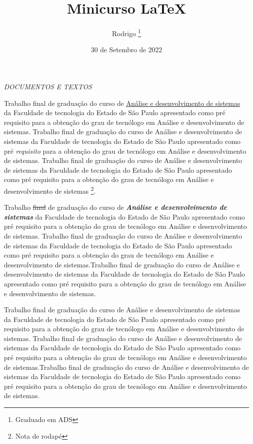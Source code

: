 \documentclass[12pt, a4paper]{article}
\begin{document}
\title{Minicurso LaTeX}
\author{Rodrigo \footnote{Graduado em ADS}}
\date{30 de Setembro de 2022}
\maketitle

\hrulefill

\begin{center}
\Large{\textit{DOCUMENTOS E TEXTOS}}
\end{center}

\hrulefill

\vspace{0.5cm}

Trabalho final de graduação do curso de \underline{Análise e desenvolvimento de sistemas} da Faculdade de tecnologia do Estado de São Paulo apresentado como pré requisito para a obtenção do grau de tecnólogo em Análise e desenvolvimento de sistemas. Trabalho final de graduação do curso de Análise e desenvolvimento de sistemas da Faculdade de tecnologia do Estado de São Paulo apresentado como pré \textit{requisito} para a obtenção do grau de tecnólogo em Análise e desenvolvimento de sistemas. Trabalho final de graduação do curso de Análise e desenvolvimento de sistemas da Faculdade de tecnologia do Estado de São Paulo apresentado como pré requisito para a obtenção do grau de tecnólogo em Análise e desenvolvimento de sistemas \footnote{Nota de rodapé}.

\begin{flushleft}
Trabalho \sout{final} de graduação do curso de \textit{\textbf{Análise e desenvolvimento de sistemas}} da Faculdade de tecnologia do Estado de São Paulo apresentado como pré requisito para a obtenção do grau de tecnólogo em Análise e desenvolvimento de sistemas. Trabalho final de graduação do curso de Análise e desenvolvimento de sistemas da Faculdade de tecnologia do Estado de São Paulo apresentado como pré requisito para a obtenção do grau de tecnólogo em Análise e desenvolvimento de sistemas.Trabalho final de graduação do curso de Análise e desenvolvimento de sistemas da Faculdade de tecnologia do Estado de São Paulo apresentado como pré requisito para a obtenção do grau de tecnólogo em Análise e desenvolvimento de sistemas.
\end{flushleft}

\begin{center}
Trabalho final de graduação do curso de Análise e desenvolvimento de sistemas da Faculdade de tecnologia do Estado de São Paulo apresentado como pré requisito para a obtenção do grau de tecnólogo em Análise e desenvolvimento de sistemas. Trabalho final de graduação do curso de Análise e desenvolvimento de sistemas da Faculdade de tecnologia do Estado de São Paulo apresentado como pré requisito para a obtenção do grau de tecnólogo em Análise e desenvolvimento de sistemas.Trabalho final de graduação do curso de Análise e desenvolvimento de sistemas da Faculdade de tecnologia do Estado de São Paulo apresentado como pré requisito para a obtenção do grau de tecnólogo em Análise e desenvolvimento de sistemas.\\
\end{center}
\end{document}
